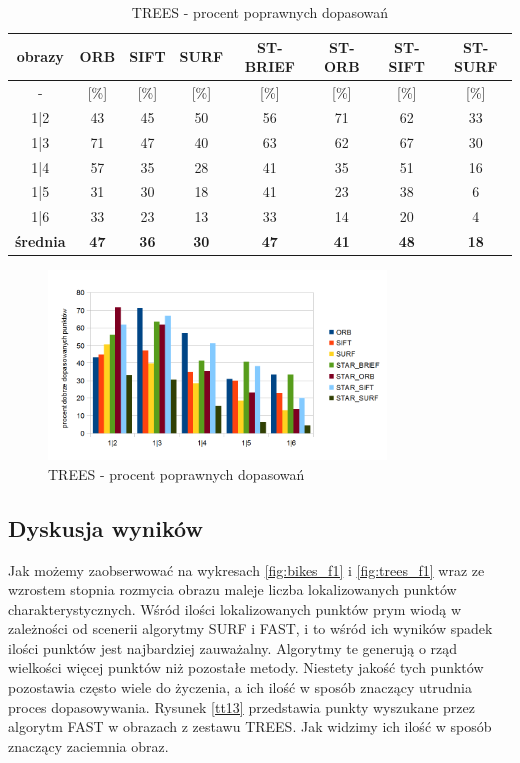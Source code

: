 \begin{table}[htbp]
  \centering
  \caption{TREES - procent poprawnych dopasowań}
    \begin{tabular}{|c|c|c|c|c|c|c|c|}\hline
    obrazy & \textbf{ORB} & \textbf{SIFT} & \textbf{SURF} & \textbf{ST-BRIEF} & \textbf{ST-ORB} & \textbf{ST-SIFT} & \textbf{ST-SURF} \\\hline
     - & [\%] & [\%] & [\%] & [\%] & [\%] & [\%] & [\%] \\\hline
    1|2 & 43 & 45 & 50 & 56 & 71 & 62 & 33 \\
    1|3 & 71 & 47 & 40 & 63 & 62 & 67 & 30 \\
    1|4 & 57 & 35 & 28 & 41 & 35 & 51 & 16 \\
    1|5 & 31 & 30 & 18 & 41 & 23 & 38 & 6 \\
    1|6 & 33 & 23 & 13 & 33 & 14 & 20 & 4 \\\hline
    \textbf{średnia} & \textbf{47} & \textbf{36} & \textbf{30} & \textbf{47} & \textbf{41} & \textbf{48} & \textbf{18} \\\hline
    
    \end{tabular}%
  \label{tab:trees_m2}%
\end{table}%


\begin{figure}
\centering
\includegraphics[width=0.8\textwidth]{pict/mikolajczyk/trees/m2.png}
\caption{TREES - procent poprawnych dopasowań}
\label{fig:trees_m2}
\end{figure}
\FloatBarrier
\subsection{Dyskusja wyników}
Jak możemy zaobserwować na wykresach \ref{fig:bikes_f1} i \ref{fig:trees_f1} wraz ze wzrostem stopnia rozmycia obrazu maleje liczba lokalizowanych punktów charakterystycznych. Wśród ilości lokalizowanych punktów prym wiodą w zależności od scenerii algorytmy SURF i FAST, i to wśród ich wyników spadek ilości punktów jest najbardziej zauważalny. Algorytmy te generują o rząd wielkości więcej punktów niż pozostałe metody. Niestety jakość tych punktów pozostawia często wiele do życzenia, a ich ilość w sposób znaczący utrudnia proces dopasowywania. Rysunek \ref{tt13} przedstawia punkty wyszukane przez algorytm FAST w obrazach z zestawu TREES. Jak widzimy ich ilość w sposób znaczący zaciemnia obraz.

